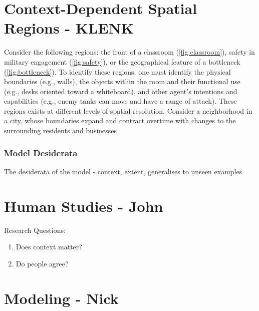 \documentclass[11pt,letterpaper]{article}
\begin{document}
\section{Context-Dependent Spatial Regions - KLENK}
Consider the following regions: the front of a classroom (\ref{fig:classroom}), safety in military engagement (\ref{fig:safety}), or the geographical feature of a bottleneck (\ref{fig:bottleneck}).  To identify these regions, one must identify the physical boundaries (e.g., walls), the objects within the room and their functional use (e.g., desks oriented toward a whiteboard), and other agent's intentions and capabilities (e.g., enemy tanks can move and have a range of attack).  These regions exists at different levels of spatial resolution.  Consider a neighborhood in a city, whose boundaries expand and contract overtime with changes to the surrounding residents and businesses


\subsubsection{Model Desiderata} %
\label{sec:desiderata}

The desiderata of the model - context, extent, generalises to unseen examples




\section{Human Studies - John}
Research Questions: 
\begin{enumerate}
	\item Does context matter?
	\item Do people agree? 
\end{enumerate}
 

\section{Modeling - Nick}
\end{document}
